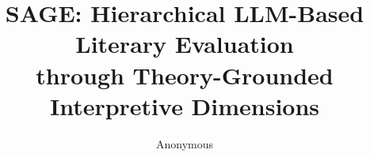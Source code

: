 \documentclass[letterpaper]{article}
\begin{document}
%
\title{SAGE: Hierarchical LLM-Based Literary Evaluation\\through Theory-Grounded Interpretive Dimensions}

\author{Anonymous}
\maketitle













\end{document}
